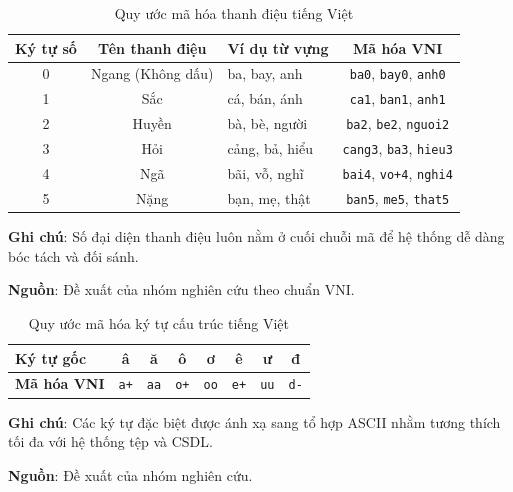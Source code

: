 \begin{table}[H]
\centering
\caption{Quy ước mã hóa thanh điệu tiếng Việt}
\label{tab:tone_encoding}
\vspace{2pt}
\begin{tabular}{cclc}
\toprule
\textbf{Ký tự số} & \textbf{Tên thanh điệu} & \textbf{Ví dụ từ vựng} & \textbf{Mã hóa VNI} \\
\midrule
0 & Ngang (Không dấu) & ba, bay, anh & \texttt{ba0}, \texttt{bay0}, \texttt{anh0} \\
1 & Sắc & cá, bán, ánh & \texttt{ca1}, \texttt{ban1}, \texttt{anh1} \\
2 & Huyền & bà, bè, người & \texttt{ba2}, \texttt{be2}, \texttt{nguoi2} \\
3 & Hỏi & cảng, bả, hiểu & \texttt{cang3}, \texttt{ba3}, \texttt{hieu3} \\
4 & Ngã & bãi, vỗ, nghĩ & \texttt{bai4}, \texttt{vo+4}, \texttt{nghi4} \\
5 & Nặng & bạn, mẹ, thật & \texttt{ban5}, \texttt{me5}, \texttt{that5} \\
\bottomrule
\end{tabular}
\par\vspace{4pt}
\begin{minipage}{0.88\textwidth}
\fontsize{12}{14}\selectfont \textbf{Ghi chú}: Số đại diện thanh điệu luôn nằm ở cuối chuỗi mã để hệ thống dễ dàng bóc tách và đối sánh.\par
\textbf{Nguồn}: Đề xuất của nhóm nghiên cứu theo chuẩn VNI.
\end{minipage}
\end{table}

\begin{table}[H]
\centering
\caption{Quy ước mã hóa ký tự cấu trúc tiếng Việt}
\label{tab:char_encoding}
\vspace{2pt}
\begin{tabular}{lccccccc}
\toprule
\textbf{Ký tự gốc} & â & ă & ô & ơ & ê & ư & đ \\
\midrule
\textbf{Mã hóa VNI} & \texttt{a+} & \texttt{aa} & \texttt{o+} & \texttt{oo} & \texttt{e+} & \texttt{uu} & \texttt{d-} \\
\bottomrule
\end{tabular}
\par\vspace{4pt}
\begin{minipage}{0.88\textwidth}
\fontsize{12}{14}\selectfont \textbf{Ghi chú}: Các ký tự đặc biệt được ánh xạ sang tổ hợp ASCII nhằm tương thích tối đa với hệ thống tệp và CSDL.\par
\textbf{Nguồn}: Đề xuất của nhóm nghiên cứu.
\end{minipage}
\end{table}

